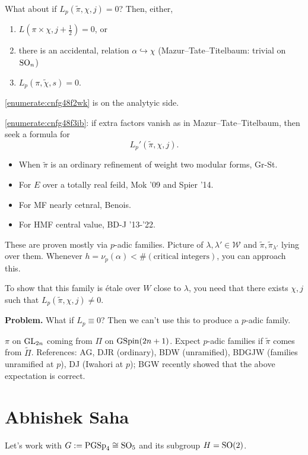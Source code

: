 \documentclass[reqno]{amsart} 
\begin{document}
What about if $L_p(\tilde{\pi}, \chi, j) = 0$?  Then, either,
\begin{enumerate}
\item\label{enumerate:cnfg48f2wk} $L(\pi \times \chi, j + \tfrac{1}{2}) = 0$, or
\item\label{enumerate:cnfg48f3ib} there is an accidental, relation $\alpha \hookrightarrow \chi$ (Mazur--Tate--Titelbaum: trivial on $\operatorname{SO}_n$)
\item\label{enumerate:cnfg48f4du} $L_p(\tilde{\pi, \chi, s})= 0$.
\end{enumerate}

\eqref{enumerate:cnfg48f2wk} is on the analytyic side.

\eqref{enumerate:cnfg48f3ib}: if extra factors vanish as in Mazur--Tate--Titelbaum, then seek a formula for
\begin{equation*}
  L_p '(\tilde{\pi}, \chi, j).
\end{equation*}
\begin{itemize}
\item When $\tilde{\pi}$ is an ordinary refinement of weight two modular forms, Gr-St.
\item For $E$ over a totally real feild, Mok '09 and Spier '14.
\item For MF nearly cetnral, Benois.
\item For HMF central value, BD-J '13-'22.
\end{itemize}
These are proven mostly via $p$-adic families.  Picture of $\lambda , \lambda ' \in \mathcal{W}$ and $\tilde{\pi}, \tilde{\pi}_{\lambda '}$ lying over them.  Whenever $h = \nu_p(\alpha) < \#(\text{critical integers})$, you can approach this.

To show that this family is {\'e}tale over $W$ close to $\lambda$, you need that there exists $\chi, j$ such that $L_p(\tilde{\pi}, \chi, j) \neq 0$.

\textbf{Problem.}  What if $L_p \equiv 0$?  Then we can't use this to produce a $p$-adic family.

$\pi$ on $\operatorname{GL}_{2n}$ coming from $\Pi$ on $\operatorname{GSpin}(2 n + 1)$.  Expect $p$-adic families if $\tilde{\pi}$ comes from $\tilde{\Pi}$.  References: AG, DJR (ordinary), BDW (unramified), BDGJW (families unramified at $p$), DJ (Iwahori at $p$); BGW recently showed that the above expectation is correct.

\section{Abhishek Saha}
Let's work with $G := \operatorname{PGSp}_4 \cong \operatorname{SO}_5$ and its subgroup $H = \operatorname{SO}(2)$.
\end{document}
